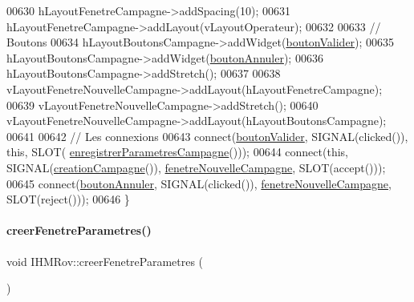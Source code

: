 \begin{DoxyCode}
00630     hLayoutFenetreCampagne->addSpacing(10);
00631     hLayoutFenetreCampagne->addLayout(vLayoutOperateur);
00632 
00633     \textcolor{comment}{// Boutons}
00634     hLayoutBoutonsCampagne->addWidget(\hyperlink{class_i_h_m_rov_a4294b6c808089083906fb0815d1c9c27}{boutonValider});
00635     hLayoutBoutonsCampagne->addWidget(\hyperlink{class_i_h_m_rov_a4a6fec1b4a86c93c1d0d62d66804db5c}{boutonAnnuler});
00636     hLayoutBoutonsCampagne->addStretch();
00637 
00638     vLayoutFenetreNouvelleCampagne->addLayout(hLayoutFenetreCampagne);
00639     vLayoutFenetreNouvelleCampagne->addStretch();
00640     vLayoutFenetreNouvelleCampagne->addLayout(hLayoutBoutonsCampagne);
00641 
00642     \textcolor{comment}{// Les connexions}
00643     connect(\hyperlink{class_i_h_m_rov_a4294b6c808089083906fb0815d1c9c27}{boutonValider}, SIGNAL(clicked()), \textcolor{keyword}{this}, SLOT(
      \hyperlink{class_i_h_m_rov_a229194814bfb1fc94ab3cc86d6411921}{enregistrerParametresCampagne}()));
00644     connect(\textcolor{keyword}{this}, SIGNAL(\hyperlink{class_i_h_m_rov_a4a4a90ab6d074aa54466f3f87db2f81c}{creationCampagne}()), 
      \hyperlink{class_i_h_m_rov_a13c12a93de7fc77c32f0108ae73cec06}{fenetreNouvelleCampagne}, SLOT(accept()));
00645     connect(\hyperlink{class_i_h_m_rov_a4a6fec1b4a86c93c1d0d62d66804db5c}{boutonAnnuler}, SIGNAL(clicked()), 
      \hyperlink{class_i_h_m_rov_a13c12a93de7fc77c32f0108ae73cec06}{fenetreNouvelleCampagne}, SLOT(reject()));
00646 \}
\end{DoxyCode}
\mbox{\label{class_i_h_m_rov_aed451139ac09ef18b7c92637761d80ce}} 
\paragraph{\texorpdfstring{creer\+Fenetre\+Parametres()}{creerFenetreParametres()}}
{\footnotesize\ttfamily void I\+H\+M\+Rov\+::creer\+Fenetre\+Parametres (\begin{DoxyParamCaption}{ }\end{DoxyParamCaption})\hspace{0.3cm}{\ttfamily [private]}}



